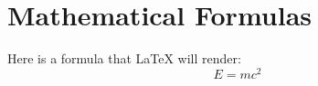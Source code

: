 \documentclass{article}
\newcommand{\blade}[1]{}
\begin{document}
\title{\blade{My Document Title}}
\author{\blade{Author Name}}
\maketitle

\section{\blade{Introduction}}
\blade{This document demonstrates how Blade directives are hidden from LaTeX.}

\blade{The \newcommand{\blade}[1]{} definition makes all \blade{...} commands invisible to LaTeX.}

\section{Mathematical Formulas}
Here is a formula that LaTeX will render:
\[
E = mc^2
\]

\blade{And here is some dynamic content that would be processed by Blade.}
\end{document}
